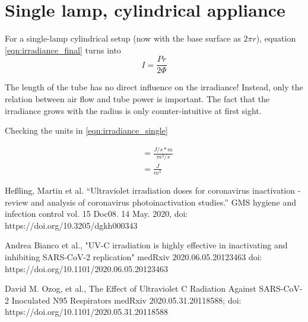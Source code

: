 \documentclass[12pt]{article}
\begin{document}
\section{Single lamp, cylindrical appliance}\label{sect:multitube}

For a single-lamp cylindrical setup (now with the base surface as $2\pi r$), equation \eqref{eqn:irradiance_final}
turns into
\begin{equation} 
I  = \frac{P r}{2 \Phi} \label{eqn:irradiance_single}
\end{equation}

The length of the tube has no direct influence on the irradiance! Instead, only the relation between air flow and tube power is important. The fact that the irradiance grows with the radius is only counter-intuitive at first sight.  

Checking the units in \eqref{eqn:irradiance_single}

\begin{align}
  [I]  &= \frac{J/s * m }{ m^3 / s }\\
    &= \frac{J}{m^2}
\end{align}


\begin{thebibliography}{9}

   Heßling, Martin et al. 
   “Ultraviolet irradiation doses for coronavirus inactivation - review and analysis of coronavirus photoinactivation studies.”
   GMS hygiene and infection control vol. 15 Doc08. 
   14 May. 2020, 
   doi: https://doi.org/10.3205/dgkh000343
   
  Andrea Bianco et al.,
  "UV-C irradiation is highly effective in inactivating and inhibiting SARS-CoV-2 replication"
  medRxiv 2020.06.05.20123463
  doi: https://doi.org/10.1101/2020.06.05.20123463 
  
  David M. Ozog, et al.,
  The Effect of Ultraviolet C Radiation Against SARS-CoV-2 Inoculated N95 Respirators
  medRxiv 2020.05.31.20118588; doi: https://doi.org/10.1101/2020.05.31.20118588 
\end{thebibliography}
\end{document}
